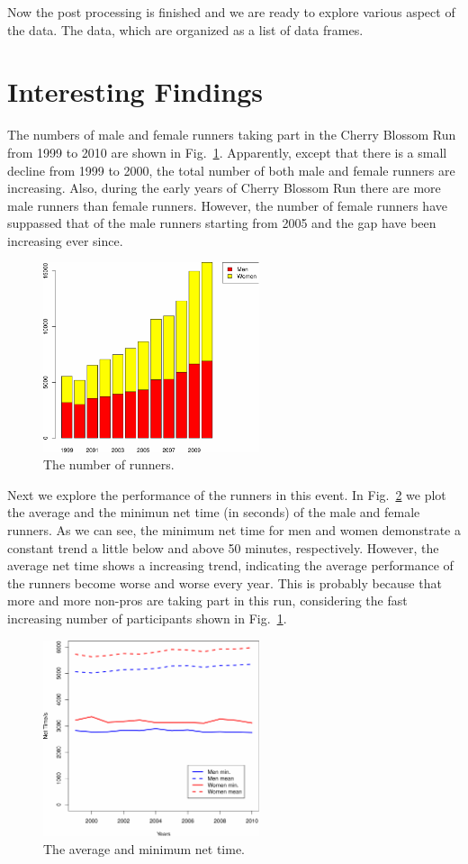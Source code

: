\documentclass[twocolumn]{article}
\begin{document}
Now the post processing is finished and we are ready to explore various aspect
of the data. The data, which are organized as a list of data frames.

\section{Interesting Findings}
The numbers of male and female runners taking part in the Cherry Blossom Run
from 1999 to 2010 are shown in Fig.~\ref{fig:num_runner}. Apparently, except
that there is a small decline from 1999 to 2000, the total number of both
male and female runners are increasing. Also, during the early years of Cherry
Blossom Run there are more male runners than female runners. However, the number
of female runners have suppassed that of the male runners starting from 2005 and
the gap have been increasing ever since.

\begin{figure}[h]
    \centering
    \includegraphics[width=2.5in]{figs/num_runner.pdf}
    \caption{The number of runners.}
    \label{fig:num_runner}
\end{figure}

Next we explore the performance of the runners in this event. In
Fig.~\ref{fig:time_net} we plot the average and the minimun net time (in
seconds) of the male and female runners. As we can see, the minimum net time for
men and women demonstrate a constant trend a little below and above 50 minutes,
respectively. However, the average net time shows a increasing trend, indicating
the average performance of the runners become worse and worse every year. This
is probably because that more and more non-pros are taking part in this run,
considering the fast increasing number of participants shown in
Fig.~\ref{fig:num_runner}.

\begin{figure}[h]
    \centering
    \includegraphics[width=2.5in]{figs/time_net.pdf}
    \caption{The average and minimum net time.}
    \label{fig:time_net}
\end{figure}
\end{document}
